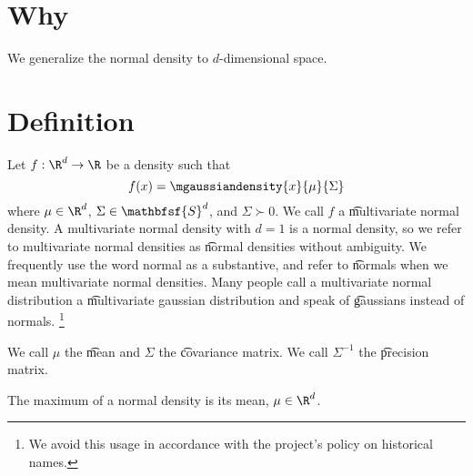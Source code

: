 
\section*{Why}

We generalize the normal density to $d$-dimensional space.

\section*{Definition}

Let $f: \R ^d \to \R $ be a density such that $$f(x) = \mgaussiandensity{x}{\mu }{\Sigma }$$ where $\mu  \in \R ^d$, $\Sigma  \in \mathbfsf{S} ^d$, and $\Sigma  \succ 0$.
We call $f$ a \t{multivariate normal density}.
A multivariate normal density with $d = 1$ is a normal density, so we refer to multivariate normal densities as \t{normal densities} without ambiguity.
We frequently use the word normal as a substantive, and refer to \t{normals} when we mean multivariate normal densities.
Many people call a multivariate normal distribution a \t{multivariate gaussian distribution} and speak of \t{gaussians} instead of normals.
  \ifhmode\unskip\fi\footnote{
We avoid this usage in accordance with the project's policy on historical names.
  }

We call $\mu $ the \t{mean} and $\Sigma $ the \t{covariance matrix}.
We call $\Sigma ^{-1}$ the \t{precision matrix}.


The maximum of a normal density is its mean, $\mu  \in \R ^d$.

\blankpage

